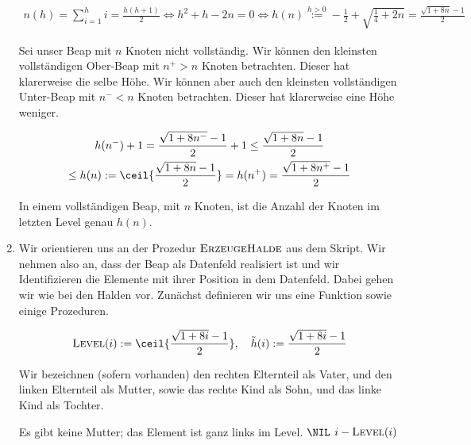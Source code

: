 \begin{solution}
\begin{enumerate}[label = \alph*]
  \begin{align*}
    n(h)
    =
    \sum_{i=1}^h i
    =
    \frac{h (h + 1)}{2}
    \iff
    h^2 + h - 2 n = 0
    \iff
    h(n)
    \stackrel{h > 0}{:=}
    -\frac{1}{2} + \sqrt{\frac{1}{4} + 2 n}
    =
    \frac{\sqrt{1 + 8 n} - 1}{2}
  \end{align*}


  Sei unser Beap mit $n$ Knoten nicht vollständig.
  Wir können den kleinsten vollständigen Ober-Beap mit $n^+ > n$ Knoten betrachten.
  Dieser hat klarerweise die selbe Höhe.
  Wir können aber auch den kleinsten vollständigen Unter-Beap mit $n^- < n$ Knoten betrachten.
  Dieser hat klarerweise eine Höhe weniger.

  \begin{multline*}
  h(n^-) + 1
  =
  \frac{\sqrt{1 + 8 n^-} - 1}{2} + 1
  \leq
  \frac{\sqrt{1 + 8 n} - 1}{2} \\
  \leq
  h(n)
  :=
  \ceil{\frac{\sqrt{1 + 8 n} - 1}{2}}
  =
  h(n^+)
  =
  \frac{\sqrt{1 + 8 n^+} - 1}{2}
  \end{multline*}

  In einem vollständigen Beap, mit $n$ Knoten, ist die Anzahl der Knoten im letzten Level genau $h(n)$.

  \item Wir orientieren uns an der Prozedur $\textsc{ErzeugeHalde}$ aus dem Skript.
  Wir nehmen also an, dass der Beap als Datenfeld realisiert ist und wir Identifizieren die Elemente mit ihrer Position in dem Datenfeld.
  Dabei gehen wir wie bei den Halden vor.
  Zunächst definieren wir uns eine Funktion sowie einige Prozeduren.


  \begin{align*}
    \textsc{Level}(i) := \ceil{\frac{\sqrt{1 + 8i} - 1}{2}},
    \quad
    \tilde h(i) := \frac{\sqrt{1 + 8 i} - 1}{2}
  \end{align*}

  Wir bezeichnen (sofern vorhanden) den rechten Elternteil als Vater, und den linken Elternteil als Mutter, sowie das rechte Kind als Sohn, und das linke Kind als Tochter.

  \phantom{}

  \begin{algorithmic}
      \Comment Es gibt keine Mutter; das Element ist ganz links im Level.
        \State \Return $\NIL$
      \Else
          \State \Return $i - \textsc{Level}(i)$
      \EndIf
    \EndProcedure
  \end{algorithmic}


\end{enumerate}
\end{solution}
